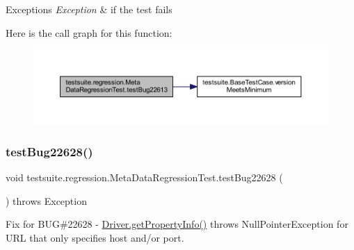 \begin{DoxyExceptions}{Exceptions}
{\em Exception} & if the test fails \\
\hline
\end{DoxyExceptions}
Here is the call graph for this function\+:
\nopagebreak
\begin{figure}[H]
\begin{center}
\leavevmode
\includegraphics[width=350pt]{classtestsuite_1_1regression_1_1_meta_data_regression_test_a5b7642788b0d18aad6874a2770cfdf5d_cgraph}
\end{center}
\end{figure}
\mbox{\label{classtestsuite_1_1regression_1_1_meta_data_regression_test_a1a86a1e268439afcb06e201e8c7bd486}} 
\subsubsection{\texorpdfstring{test\+Bug22628()}{testBug22628()}}
{\footnotesize\ttfamily void testsuite.\+regression.\+Meta\+Data\+Regression\+Test.\+test\+Bug22628 (\begin{DoxyParamCaption}{ }\end{DoxyParamCaption}) throws Exception}

Fix for B\+UG\#22628 -\/ \mbox{\hyperlink{classcom_1_1mysql_1_1jdbc_1_1_non_registering_driver_a726bb5014e1cdfffa313257781d4496d}{Driver.\+get\+Property\+Info()}} throws Null\+Pointer\+Exception for U\+RL that only specifies host and/or port.


